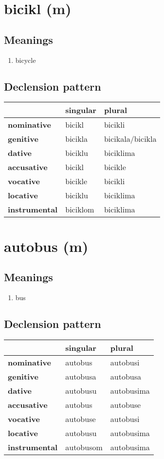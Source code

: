 \filbreak
\section{bicikl (m)}
\subsection*{Meanings}
\begin{enumerate}
\item bicycle
\end{enumerate}
\subsection*{Declension pattern}
\begin{tabularx}{\linewidth}{Xll}
\toprule
{} &  singular &            plural \\
\midrule
\textbf{nominative  } &    bicikl &           bicikli \\
\textbf{genitive    } &   bicikla &  bicikala/bicikla \\
\textbf{dative      } &   biciklu &         biciklima \\
\textbf{accusative  } &    bicikl &           bicikle \\
\textbf{vocative    } &   bicikle &           bicikli \\
\textbf{locative    } &   biciklu &         biciklima \\
\textbf{instrumental} &  biciklom &         biciklima \\
\bottomrule
\end{tabularx}

\filbreak
\section{autobus (m)}
\subsection*{Meanings}
\begin{enumerate}
\item bus
\end{enumerate}
\subsection*{Declension pattern}
\begin{tabularx}{\linewidth}{Xll}
\toprule
{} &   singular &      plural \\
\midrule
\textbf{nominative  } &    autobus &    autobusi \\
\textbf{genitive    } &   autobusa &    autobusa \\
\textbf{dative      } &   autobusu &  autobusima \\
\textbf{accusative  } &    autobus &    autobuse \\
\textbf{vocative    } &   autobuse &    autobusi \\
\textbf{locative    } &   autobusu &  autobusima \\
\textbf{instrumental} &  autobusom &  autobusima \\
\bottomrule
\end{tabularx}

